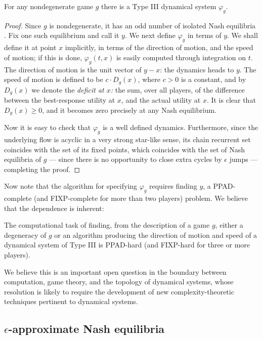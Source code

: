 \documentclass[11pt]{article}
\begin{document}
\begin{theorem}\label{thm:nondeg_dynamics}
For any nondegenerate game $g$ there is a Type III dynamical system $\varphi_g$.
\end{theorem}
\begin{proof}
Since $g$ is nondegenerate, it has an odd number of isolated Nash equilibria \citep{Shapley1974}. Fix one such equilibrium and call it $y$.  We next define $\varphi_g$ in terms of $y$. We shall define it at point $x$ implicitly, in terms of the direction of motion, and the speed of motion; if this is done, $\varphi_g(t,x)$ is easily computed through integration on $t$.  The direction of motion is the unit vector of $y-x$: the dynamics heads to $y$.  The speed of motion is defined to be $c\cdot D_g(x)$, where $c>0$ is a constant, and by $D_g(x)$ we denote the {\em deficit at $x$:} the sum, over all players, of the difference between the best-response utility at $x$, and the actual utility at $x$.  It is clear that $D_g(x)\geq 0$, and it becomes zero precisely at any Nash equilibrium.

Now it is easy to check that $\varphi_g$ is a well defined dynamics. Furthermore, since the underlying flow is acyclic in a very strong star-like sense, its chain recurrent set coincides with the set of its fixed points, which coincides with the set of Nash equilibria of $g$ --- since there is no opportunity to close extra cycles by $\epsilon$ jumps --- completing the proof.
\end{proof}

Now note that the algorithm for specifying $\varphi_g$ requires finding $y$, a PPAD-complete (and FIXP-complete for more than two players) problem. We believe that the dependence is inherent:

\begin{conjecture}
The computational task of finding, from  the description of a game $g$, either a degeneracy of $g$ or an algorithm producing the direction of motion and speed of a dynamical system of Type III is PPAD-hard (and FIXP-hard for three or more players).
\end{conjecture}

We believe this is an important open question in the boundary between computation, game theory, and the topology of dynamical systems, whose resolution is likely to require the development of new complexity-theoretic techniques pertinent to dynamical systems.


\subsection{$\epsilon$-approximate Nash equilibria}
\end{document}
